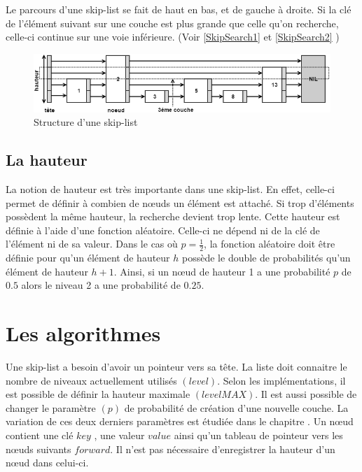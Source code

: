 \documentclass[hidelinks,a4paper, 12pt]{article}
\begin{document}
	Le parcours d'une skip-list se fait de haut en bas, et de gauche à droite. Si la clé de l'élément suivant sur une couche est plus grande que celle qu'on recherche, celle-ci continue sur une voie inférieure. (Voir \cref{SkipSearch1} et \cref{SkipSearch2} )	
	
	\begin{figure}[h]
		\includegraphics[width=\textwidth]{img/struct}
		\caption{Structure d'une skip-list}
		\label{StructSkip}
	\end{figure}
	
	\subsection{La hauteur}
	La notion de hauteur est très importante dans une skip-list. En effet, celle-ci permet de définir à combien de nœuds un élément est attaché. Si trop d'éléments possèdent la même hauteur, la recherche devient trop lente.	Cette hauteur est définie à l'aide d'une fonction aléatoire. Celle-ci ne dépend ni de la clé de l'élément ni de sa valeur. Dans le cas où $p=\frac{1}{2}$, la fonction aléatoire doit être définie pour qu'un élément de hauteur $h$ possède le double de probabilités qu'un élément de hauteur $h+1$. Ainsi, si un nœud de hauteur 1 a une probabilité $p$ de $0.5$ alors le niveau 2 a une probabilité de $0.25$.
		
	\newpage
	\section{Les algorithmes}
	Une skip-list a besoin d'avoir un pointeur vers sa tête. La liste doit connaitre le nombre de niveaux actuellement utilisés $(level)$. Selon les implémentations, il est possible de définir la hauteur maximale $(levelMAX)$. Il est aussi possible de changer le paramètre $(p)$ de probabilité de création d'une nouvelle couche. La variation de ces deux derniers paramètres est étudiée dans le chapitre .
	Un nœud contient une clé $key$ , une valeur $value$ ainsi qu'un tableau de pointeur vers les nœuds suivants $forward$. Il n'est pas nécessaire d'enregistrer la hauteur d'un nœud dans celui-ci.
	
	
\end{document}
